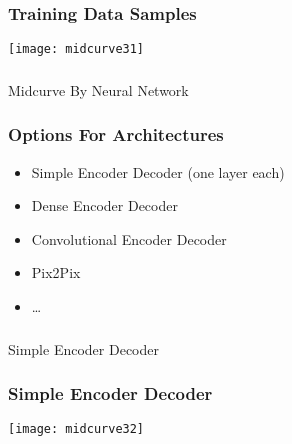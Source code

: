 \begin{frame}[fragile]\frametitle{Training Data Samples}

\begin{center}
\texttt{[image: midcurve31]}
\end{center}	
\end{frame}

\begin{frame}[fragile]\frametitle{}
\begin{center}
{\Large Midcurve By Neural Network}
\end{center}
\end{frame}

\begin{frame}[fragile]\frametitle{Options For Architectures}
	\begin{itemize}
	\item Simple Encoder Decoder (one layer each)
	\item Dense Encoder Decoder
	\item Convolutional Encoder Decoder
	\item Pix2Pix
	\item \ldots
	\end{itemize}	
\end{frame}

\begin{frame}[fragile]\frametitle{}
\begin{center}
{\Large Simple Encoder Decoder}
\end{center}
\end{frame}

\begin{frame}[fragile]\frametitle{Simple Encoder Decoder}

\begin{center}
\texttt{[image: midcurve32]}
\end{center}	
\end{frame}

